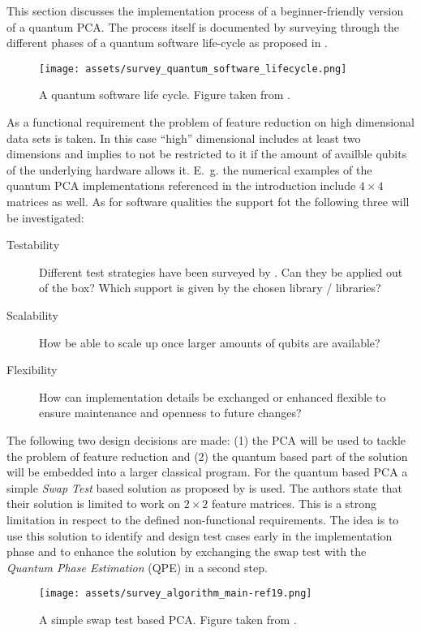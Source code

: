 \noindent
This section discusses the implementation process of a beginner-friendly version of a quantum PCA. The process itself is documented by surveying through the different phases of a quantum software life-cycle as proposed in \cite{Zhao_2020}.

\begin{figure}
  \centering
  \texttt{[image: assets/survey\_quantum\_software\_lifecycle.png]}
  \caption{A quantum software life cycle. Figure taken from \cite{Zhao_2020}.}
  \label{fig:lifecycle}
\end{figure}

As a functional requirement the problem of feature reduction on high dimensional data sets is taken. In this case \enquote{high} dimensional includes at least two dimensions and implies to not be restricted to it if the amount of availble qubits of the underlying hardware allows it. E.~g. the numerical examples of the quantum PCA implementations referenced in the introduction include $4 \times 4$ matrices as well. As for software qualities the support fot the following three will be investigated:
\begin{description}
  \item [Testability] Different test strategies have been surveyed by \cite{Zhao_2020}. Can they be applied out of the box? Which support is given by the chosen library / libraries?
  \item [Scalability] How be able to scale up once larger amounts of qubits are available?
  \item [Flexibility] How can implementation details be exchanged or enhanced flexible to ensure maintenance and openness to future changes?
\end{description}

The following two design decisions are made: (1) the PCA will be used to tackle the problem of feature reduction and (2) the quantum based part of the solution will be embedded into a larger classical program. For the quantum based PCA a simple \emph{Swap Test} based solution as proposed by \cite{Lokho_2020} is used. The authors state that their solution is limited to work on $2 \times 2$ feature matrices. This is a strong limitation in respect to the defined non-functional requirements. The idea is to use this solution to identify and design test cases early in the implementation phase and to enhance the solution by exchanging the swap test with the \emph{Quantum Phase Estimation} (QPE) in a second step.

\begin{figure}
  \centering
  \texttt{[image: assets/survey\_algorithm\_main-ref19.png]}
  \caption{A simple swap test based PCA. Figure taken from \cite{Lokho_2020}.}
  \label{fig:mainref19}
\end{figure}

